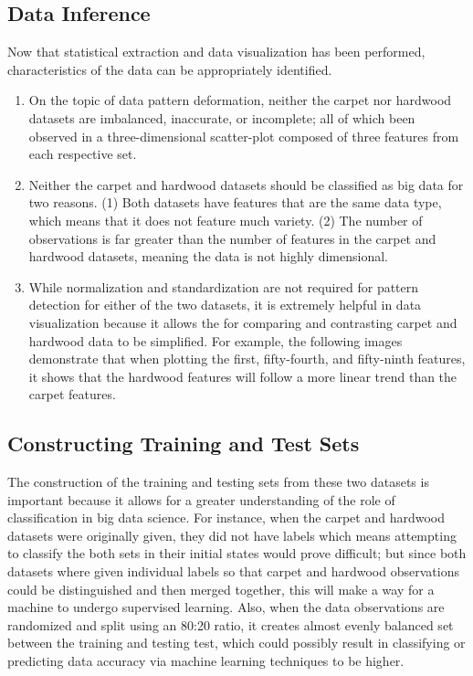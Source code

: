 \documentclass[a4paper,12pt]{IEEEtran}
\begin{document}
\subsection{Data Inference}
\label{sec3}
Now that statistical extraction and data visualization has been performed, characteristics of the data can be appropriately identified.
\begin{enumerate}
\item On the topic of data pattern deformation, neither the carpet nor hardwood datasets are imbalanced, inaccurate, or incomplete; all of which been observed in a three-dimensional scatter-plot composed of three features from each respective set.

\item Neither the carpet and hardwood datasets should be classified as big data for two reasons. (1) Both datasets have features that are the same data type, which means that it does not feature much variety. (2) The number of observations is far greater than the number of features in the carpet and hardwood datasets, meaning the data is not highly dimensional.
\item While normalization and standardization are not required for pattern detection for either of the two datasets, it is extremely helpful in data visualization because it allows the for comparing and contrasting carpet and hardwood data to be simplified. For example, the following images demonstrate that when plotting the first, fifty-fourth, and fifty-ninth features, it shows that the hardwood features will follow a more linear trend than the carpet features.

\end{enumerate}


\subsection{Constructing Training and Test Sets}
\label{sec4}
The construction of the training and testing sets from these two datasets is important because it allows for a greater understanding of the role of classification in big data science. For instance, when the carpet and hardwood datasets were originally given, they did not have labels which means attempting to classify the both sets in their initial states would prove difficult; but since both datasets where given individual labels so that carpet and hardwood observations could be distinguished and then merged together, this will make a way for a machine to undergo supervised learning. Also, when the data observations are randomized and split using an 80:20 ratio, it creates almost evenly balanced set between the training and testing test, which could possibly result in classifying or predicting data accuracy via machine learning techniques to be higher.
\end{document}

